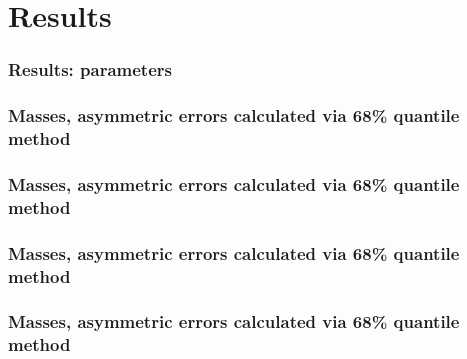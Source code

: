 \documentclass[10pt]{beamer}
\begin{document}
\section{Results}
\begin{frame}
\frametitle{Results: parameters}
\scriptsize{
\begin{table}[tb!]
\begin{center}


\end{center}
\end{table}
}
\end{frame}



\begin{frame}
\frametitle{\small{Masses, asymmetric errors calculated via 68\% quantile method}}
\vspace{-3mm}
\tiny{
\begin{table}[tb!]

\end{table}
}
\end{frame}


\begin{frame}
\frametitle{\small{Masses, asymmetric errors calculated via 68\% quantile method}}
\tiny{
\begin{table}[tb!]

\end{table}
}
\end{frame}

\begin{frame}
\frametitle{\small{Masses, asymmetric errors calculated via 68\% quantile method}}
\tiny{
\begin{table}[tb!]

\end{table}
}
\end{frame}


\begin{frame}
\frametitle{\small{Masses, asymmetric errors calculated via 68\% quantile method}}
\tiny{
\begin{table}[tb!]

\end{table}
}
\end{frame}
\end{document}
